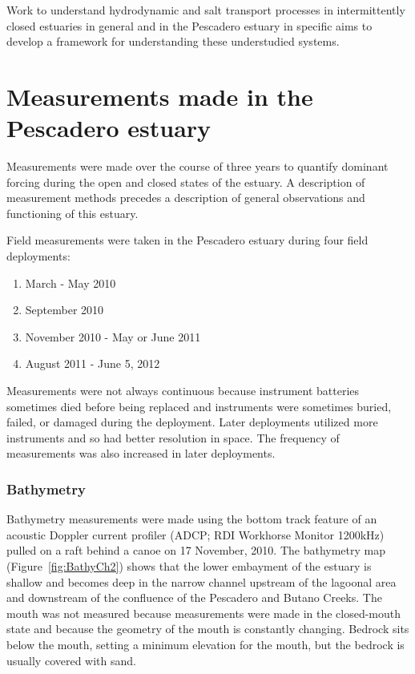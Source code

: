 Work to understand hydrodynamic and salt transport processes in intermittently closed estuaries in general and in the Pescadero estuary in specific aims to develop a framework for understanding these understudied systems. 

\section{Measurements made in the Pescadero estuary} \label{measurementslabel}

Measurements were made over the course of three years to quantify dominant forcing during the open and closed states of the estuary. A description of measurement methods precedes a description of general observations and functioning of this estuary.

Field measurements were taken in the Pescadero estuary during four field deployments:

\begin{enumerate}
	\item March - May 2010 
	\item September 2010 
	\item November 2010 - May or June 2011 
	\item August 2011 - June 5, 2012
\end{enumerate}

 Measurements were not always continuous because instrument batteries sometimes died before being replaced and instruments were sometimes buried, failed, or damaged during the deployment. Later deployments utilized more instruments and so had better resolution in space.  The frequency of measurements was also increased in later deployments. 

\subsubsection{Bathymetry} \label{sssec:bathymetry}
Bathymetry measurements were made using the bottom track feature of an acoustic Doppler current profiler (ADCP; RDI Workhorse Monitor 1200kHz) pulled on a raft behind a canoe on 17 November, 2010. The bathymetry map (Figure~\ref{fig:BathyCh2}) shows that the lower embayment of the estuary is shallow and becomes deep in the narrow channel upstream of the lagoonal area and downstream of the confluence of the Pescadero and Butano Creeks. The mouth was not measured because measurements were made in the closed-mouth state and because the geometry of the mouth is constantly changing. Bedrock sits below the mouth, setting a minimum elevation for the mouth, but the bedrock is usually covered with sand. 


